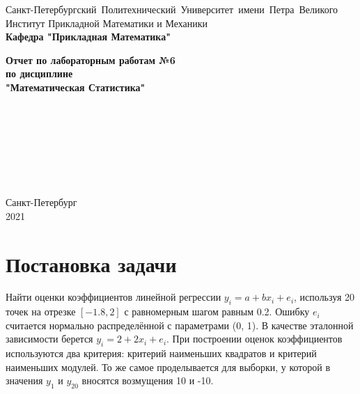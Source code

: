 \documentclass[a4paper]{article}
\author{Тырыкин Я. А. }
\date{March 2021}
\begin{document}
\begin{titlepage}
    \begin{center}
        \mbox{\normalsize{Санкт-Петербургский Политехнический Университет имени Петра Великого}}\\
        \normalsize{Институт Прикладной Математики и Механики}\\
        \large{\textbf{Кафедра "Прикладная Математика"}}
        
        \vfill
        
        \textbf{\Large{Отчет по лабораторным работам №6}}\\
        \textbf{\large{по дисциплине}}\\
        \textbf{\large"Математическая Статистика"}
        
        \vfill
        \\
        \\
        \\
        \\
        \\
        \\
        
        \vfill
    
    \end{center}
    
    \begin{center} 
        Санкт-Петербург \\
        2021 
    \end{center}
\end{titlepage}
\newpage

\begin{center}
    \listoffigures
\end{center}
\newpage

\section{Постановка задачи}
    Найти оценки коэффициентов линейной регрессии $y_i = a + bx_i + e_i$, используя 20 точек на отрезке $[-1.8, 2]$ с равномерным шагом равным 0.2. Ошибку $e_i$ считается нормально распределённой с параметрами (0, 1). В качестве эталонной зависимости берется $y_i = 2 + 2x_i + e_i$. При построении оценок  коэффициентов используются два критерия: критерий наименьших квадратов и критерий наименьших модулей. То же самое проделывается для выборки, у которой в значения $y_1$ и $y_{20}$ вносятся возмущения 10 и -10.
\end{document}
